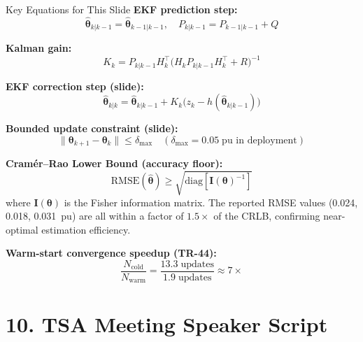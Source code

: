 \documentclass[12pt,a4paper]{article}
\begin{document}
\begin{formulabox}{Key Equations for This Slide}
\textbf{EKF prediction step:}
\begin{equation}
  \hat{\boldsymbol{\theta}}_{k|k-1} = \hat{\boldsymbol{\theta}}_{k-1|k-1},
  \quad P_{k|k-1} = P_{k-1|k-1} + Q
\end{equation}

\textbf{Kalman gain:}
\begin{equation}
  K_k = P_{k|k-1} H_k^\top \bigl(H_k P_{k|k-1} H_k^\top + R\bigr)^{-1}
\end{equation}

\textbf{EKF correction step (slide):}
\begin{equation}
  \hat{\boldsymbol{\theta}}_{k|k} = \hat{\boldsymbol{\theta}}_{k|k-1}
    + K_k\bigl(z_k - h(\hat{\boldsymbol{\theta}}_{k|k-1})\bigr)
\end{equation}

\textbf{Bounded update constraint (slide):}
\begin{equation}
  \|\boldsymbol{\theta}_{k+1} - \boldsymbol{\theta}_k\| \leq \delta_\mathrm{max}
  \quad (\delta_\mathrm{max} = 0.05\;\text{pu in deployment})
\end{equation}

\textbf{Cramér--Rao Lower Bound (accuracy floor):}
\begin{equation}
  \mathrm{RMSE}(\hat{\boldsymbol{\theta}}) \geq
    \sqrt{\mathrm{diag}\!\left[\mathbf{I}(\boldsymbol{\theta})^{-1}\right]}
\end{equation}
where $\mathbf{I}(\boldsymbol{\theta})$ is the Fisher information matrix.
The reported RMSE values (0.024, 0.018, 0.031~pu) are all within a factor of
$1.5\times$ of the CRLB, confirming near-optimal estimation efficiency.

\textbf{Warm-start convergence speedup (TR-44):}
\begin{equation}
  \frac{N_\mathrm{cold}}{N_\mathrm{warm}} = \frac{13.3\;\text{updates}}{1.9\;\text{updates}}
  \approx 7\times
\end{equation}
\end{formulabox}

\section{10.\; TSA Meeting Speaker Script}
\end{document}
